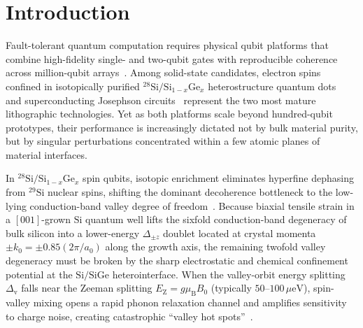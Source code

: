 \documentclass[11pt,letterpaper]{article}
\theoremstyle{definition}
\begin{document}
\begin{abstract}
$4.86\,\mathrm{ms}$ ($T_2^{\mathrm{echo}} = 6.92\,\mathrm{ms}$). All analytical bounds are benchmarked against $sp^3d^5s^*$ atomistic tight-binding and 8-state Bogoliubov--Lindblad master-equation simulations.
\end{abstract}

\section{Introduction}

Fault-tolerant quantum computation requires physical qubit platforms that combine high-fidelity single- and two-qubit gates with reproducible coherence across million-qubit arrays~\cite{Fowler2012, Loss1998, Burkard2023}. Among solid-state candidates, electron spins confined in isotopically purified ${}^{28}\mathrm{Si}/\mathrm{Si}_{1-x}\mathrm{Ge}_x$ heterostructure quantum dots~\cite{Zwanenburg2013, Veldhorst2014, Xue2022, Noiri2022, Philips2022} and superconducting Josephson circuits~\cite{Koch2007, Place2021, Wang2022, Somoroff2023} represent the two most mature lithographic technologies. Yet as both platforms scale beyond hundred-qubit prototypes, their performance is increasingly dictated not by bulk material purity, but by singular perturbations concentrated within a few atomic planes of material interfaces.

In ${}^{28}\mathrm{Si}/\mathrm{Si}_{1-x}\mathrm{Ge}_x$ spin qubits, isotopic enrichment eliminates hyperfine dephasing from ${}^{29}\mathrm{Si}$ nuclear spins, shifting the dominant decoherence bottleneck to the low-lying conduction-band valley degree of freedom~\cite{Friesen2007, Saraiva2009, Culcer2010}. Because biaxial tensile strain in a $[001]$-grown $\mathrm{Si}$ quantum well lifts the sixfold conduction-band degeneracy of bulk silicon into a lower-energy $\Delta_{\pm z}$ doublet located at crystal momenta $\pm k_0 = \pm 0.85(2\pi/a_0)$ along the growth axis, the remaining twofold valley degeneracy must be broken by the sharp electrostatic and chemical confinement potential at the $\mathrm{Si/SiGe}$ heterointerface. When the valley-orbit energy splitting $\Delta_{\mathrm{v}}$ falls near the Zeeman splitting $E_{\mathrm{Z}} = g\mu_{\mathrm{B}}B_0$ (typically $50$--$100\,\mu\mathrm{eV}$), spin-valley mixing opens a rapid phonon relaxation channel and amplifies sensitivity to charge noise, creating catastrophic ``valley hot spots''~\cite{Yang2013, Hollmann2020, PaqueletWuetz2022}.
\end{document}

